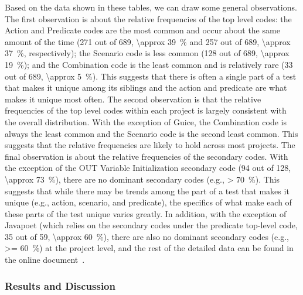 Based on the data shown in these tables, we can draw some general observations.
%
The first observation is about the relative frequencies of the top level codes: the Action and Predicate codes are the most common and occur about the same amount of the time (\num{271} out of \num{689}, \SI{\approx 39}{\percent} and \num{257} out of \num{689}, \SI{\approx 37}{\percent}, respectively); the Scenario code is less common (\num{128} out of \num{689}, \SI{\approx 19}{\percent}); and the Combination code is the least common and is relatively rare (\num{33} out of \num{689}, \SI{\approx 5}{\percent}).
%
This suggests that there is often a single part of a test that makes it unique among its siblings and the action and predicate are what makes it unique most often.
%
The second observation is that the relative frequencies of the top level codes within each project is largely consistent with the overall distribution.
%
With the exception of Guice, the Combination code is always the least common and the Scenario code is the second least common.
%
This suggests that the relative frequencies are likely to hold across most projects.
%
The final observation is about the relative frequencies of the secondary codes.  With the exception of the OUT Variable Initialization secondary code (\num{94} out of \num{128}, \SI{\approx 73}{\percent}), there are no dominant secondary codes (e.g., \SI{> 70}{\percent}).
%
This suggests that while there may be trends among the part of a test that makes it unique (e.g., action, scenario, and predicate), the specifics of what make each of these parts of the test unique varies greatly.
%
In addition, with the exception of Javapoet (which relies on the secondary codes under the predicate top-level code, 35 out of 59, \SI{\approx 60}{\percent}), there are also no dominant secondary codes (e.g., \SI{>= 60}{\percent}) at the project level, and the rest of the detailed data can be found in the online document~\cite{emp-study}.


\subsubsection{Results and Discussion}

